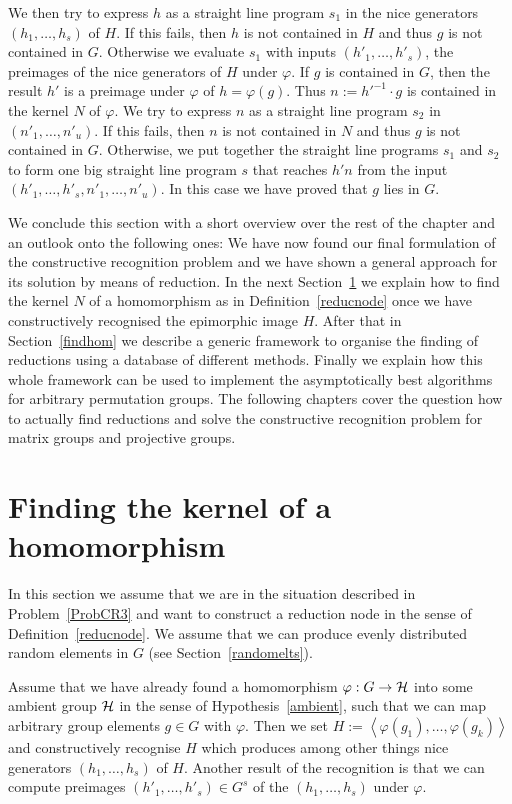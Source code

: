 We then try to express $h$ as a straight 
line program $s_1$ in the nice generators $(h_1, \ldots, h_s)$ of $H$. If this
fails, then $h$ is not contained in $H$ and thus $g$ is not contained in
$G$. Otherwise we evaluate $s_1$ with inputs
$(h'_1, \ldots, h'_s)$, the preimages of the nice generators of $H$ under
$\varphi$. If $g$ is contained in $G$, then the result $h'$ is a preimage 
under $\varphi$ of $h = \varphi(g)$. Thus $n := h'^{-1}\cdot g$ is contained
in the kernel $N$ of $\varphi$. We try to express $n$ as a straight
line program $s_2$ in $(n'_1, \ldots, n'_u)$. If this fails, then $n$
is not contained in $N$ and thus $g$ is not contained in $G$. Otherwise,
we put together the straight line programs $s_1$ and $s_2$ to form
one big straight line program $s$ that reaches $h'n$ from the input 
$(h'_1, \ldots, h'_s, n'_1, \ldots, n'_u)$. In this case we have proved
that $g$ lies in $G$.
\proofend

\medskip
We conclude this section with a short overview over the rest of the chapter
and an outlook onto the following ones:
We have now found our final formulation of the constructive
recognition problem and we have shown a general approach for its solution
by means of reduction. In the next Section~\ref{findkernel} we explain how
to find the kernel $N$ of a homomorphism as in Definition~\ref{reducnode}
once we have constructively recognised the epimorphic image $H$. After that
in Section~\ref{findhom} we describe a generic framework to organise the
finding of reductions using a database of different methods. Finally we
explain how this whole framework can be used to implement the
asymptotically best algorithms for arbitrary permutation groups.
The following chapters cover the question how to actually find reductions
and solve the constructive recognition problem for matrix groups and
projective groups.

\section{Finding the kernel of a homomorphism}
\label{findkernel}

In this section we assume that we are in the situation described in
Problem~\ref{ProbCR3} and want to construct a reduction node in the sense
of Definition~\ref{reducnode}. We assume that we can produce evenly
distributed random elements in $G$ (see Section~\ref{randomelts}).

Assume that we have already found a homomorphism
$\varphi : G \to \mathcal{H}$ into some ambient group $\mathcal{H}$ in the sense of
Hypothesis~\ref{ambient}, such that we can map arbitrary group elements
$g \in G$ with $\varphi$. Then we set $H := \left< \varphi(g_1), \ldots,
\varphi(g_k) \right>$ and constructively recognise $H$ which produces
among other things nice generators $(h_1, \ldots, h_s)$ of $H$. Another
result of the recognition is that we can compute preimages $(h'_1, \ldots,
h'_s) \in G^s$ of the $(h_1, \ldots, h_s)$ under $\varphi$.

